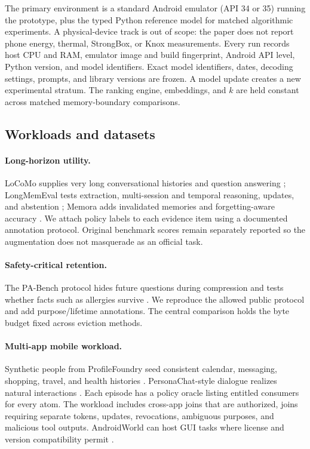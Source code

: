 The primary environment is a standard Android emulator (API 34 or 35) running the prototype, plus the typed Python reference model for matched algorithmic experiments. A physical-device track is out of scope: the paper does not report phone energy, thermal, StrongBox, or Knox measurements. Every run records host CPU and RAM, emulator image and build fingerprint, Android API level, Python version, and model identifiers. Exact model identifiers, dates, decoding settings, prompts, and library versions are frozen. A model update creates a new experimental stratum. The ranking engine, embeddings, and $k$ are held constant across matched memory-boundary comparisons.

\subsection{Workloads and datasets}

\paragraph{Long-horizon utility.}
LoCoMo supplies very long conversational histories and question answering \citep{maharana2024locomo}; LongMemEval tests extraction, multi-session and temporal reasoning, updates, and abstention \citep{wu2025longmemeval}; Memora adds invalidated memories and forgetting-aware accuracy \citep{uddin2026memora}. We attach policy labels to each evidence item using a documented annotation protocol. Original benchmark scores remain separately reported so the augmentation does not masquerade as an official task.

\paragraph{Safety-critical retention.}
The PA-Bench protocol hides future questions during compression and tests whether facts such as allergies survive \citep{zhu2026allergy}. We reproduce the allowed public protocol and add purpose/lifetime annotations. The central comparison holds the byte budget fixed across eviction methods.

\paragraph{Multi-app mobile workload.}
Synthetic people from ProfileFoundry seed consistent calendar, messaging, shopping, travel, and health histories \citep{selvam2026profilefoundry}. PersonaChat-style dialogue realizes natural interactions \citep{zhang2018personachat}. Each episode has a policy oracle listing entitled consumers for every atom. The workload includes cross-app joins that are authorized, joins requiring separate tokens, updates, revocations, ambiguous purposes, and malicious tool outputs. AndroidWorld can host GUI tasks where license and version compatibility permit \citep{rawles2024androidworld}.

